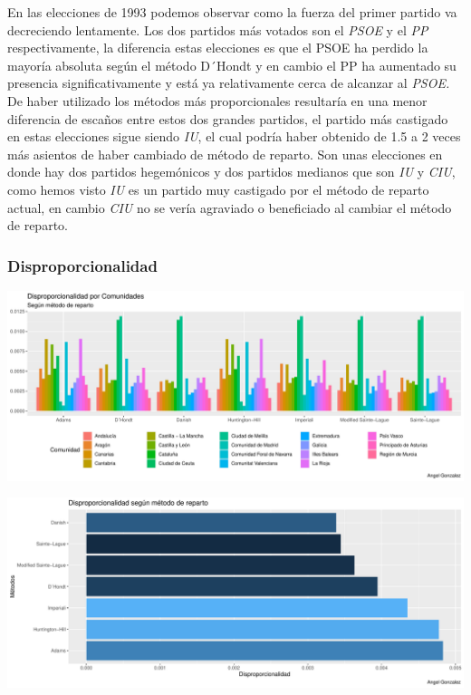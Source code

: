 \documentclass[12pt,a4paper,]{book}
\numberwithin{dummy}{section}
\theoremstyle{ocrenumbox}
\theoremstyle{blacknumex}
\theoremstyle{blacknumbox}
\theoremstyle{ocrenum}
\theoremstyle{ocrenum}
\begin{document}
En las elecciones de 1993 podemos observar como la fuerza del primer
partido va decreciendo lentamente. Los dos partidos más votados son el
\emph{PSOE} y el \emph{PP} respectivamente, la diferencia estas
elecciones es que el PSOE ha perdido la mayoría absoluta según el método
D´Hondt y en cambio el PP ha aumentado su presencia significativamente y
está ya relativamente cerca de alcanzar al \emph{PSOE.} De haber
utilizado los métodos más proporcionales resultaría en una menor
diferencia de escaños entre estos dos grandes partidos, el partido más
castigado en estas elecciones sigue siendo \emph{IU}, el cual podría
haber obtenido de 1.5 a 2 veces más asientos de haber cambiado de método
de reparto. Son unas elecciones en donde hay dos partidos hegemónicos y
dos partidos medianos que son \emph{IU} y \emph{CIU}, como hemos visto
\emph{IU} es un partido muy castigado por el método de reparto actual,
en cambio \emph{CIU} no se vería agraviado o beneficiado al cambiar el
método de reparto.

\hypertarget{disproporcionalidad-5}{%
\subsubsection{Disproporcionalidad}\label{disproporcionalidad-5}}

\begin{center}\includegraphics[width=0.95\linewidth]{figurasR/unnamed-chunk-105-1} \end{center}

\begin{center}\includegraphics[width=0.95\linewidth]{figurasR/unnamed-chunk-105-2} \end{center}
\end{document}

